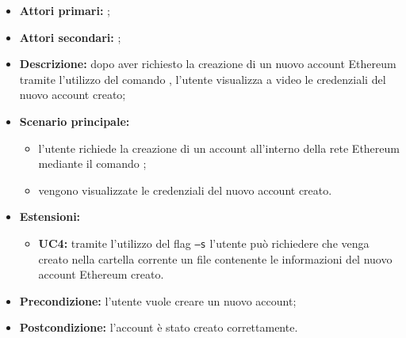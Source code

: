 \begin{itemize}
	\item \textbf{Attori primari:} \una{};
	\item \textbf{Attori secondari:} \re{};
	\item \textbf{Descrizione:} dopo aver richiesto la creazione di un nuovo account Ethereum tramite l’utilizzo del comando \signup{}, l’utente visualizza a video le credenziali del nuovo account creato; 
	\item \textbf{Scenario principale:}
	\begin{itemize}
		\item l’utente richiede la creazione di un account all’interno della rete Ethereum mediante il comando \signup{};
		\item vengono visualizzate le credenziali del nuovo account creato. 
	\end{itemize}
	\item \textbf{Estensioni:} 
	\begin{itemize}
		\item \textbf{UC4:} tramite l’utilizzo del flag \texttt{–s} l’utente può richiedere che venga creato nella cartella corrente un file contenente le informazioni del nuovo account Ethereum creato.
	\end{itemize}
	\item \textbf{Precondizione:} l'utente vuole creare un nuovo account; 
	\item \textbf{Postcondizione:} l’account è stato creato correttamente. 
\end{itemize}